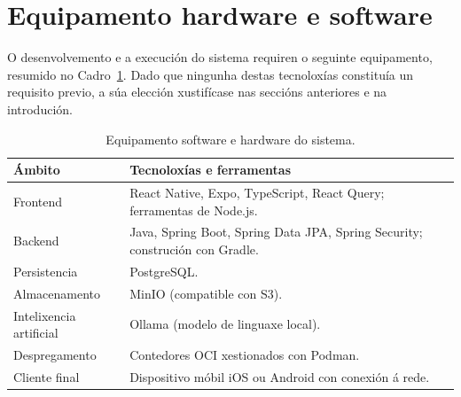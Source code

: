 \section{Equipamento hardware e software}

O desenvolvemento e a execución do sistema requiren o seguinte equipamento, resumido no
Cadro~\ref{tab:equipamento}. Dado que ningunha destas tecnoloxías constituía un requisito
previo, a súa elección xustifícase nas seccións anteriores e na introdución.

\begin{table}[H]
  \caption{Equipamento software e hardware do sistema.}
  \label{tab:equipamento}
  \centering
  \begin{tabularx}{\textwidth}{@{}lX@{}}
    \toprule
    \textbf{Ámbito} & \textbf{Tecnoloxías e ferramentas} \\
    \midrule
    Frontend        & React Native, Expo, TypeScript, React Query; ferramentas de Node.js. \\
    Backend         & Java, Spring Boot, Spring Data JPA, Spring Security; construción con Gradle. \\
    Persistencia    & PostgreSQL. \\
    Almacenamento   & MinIO (compatible con S3). \\
    Intelixencia artificial & Ollama (modelo de linguaxe local). \\
    Despregamento   & Contedores OCI xestionados con Podman. \\
    Cliente final   & Dispositivo móbil iOS ou Android con conexión á rede. \\
    \bottomrule
  \end{tabularx}
\end{table}
